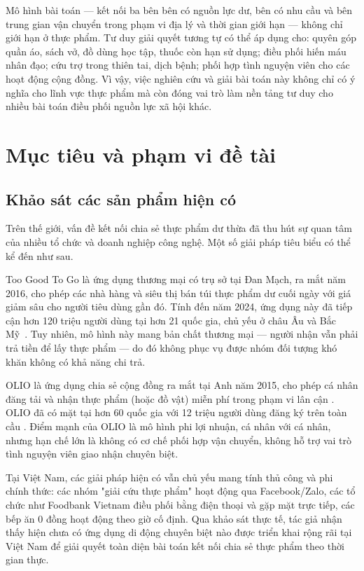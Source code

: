 \documentclass[../main.tex]{subfiles}%
\begin{document}
Mô hình bài toán — kết nối ba bên bên có nguồn lực dư, bên có nhu cầu và bên trung gian vận chuyển trong phạm vi địa lý và thời gian giới hạn — không chỉ giới hạn ở thực phẩm. Tư duy giải quyết tương tự có thể áp dụng cho: quyên góp quần áo, sách vở, đồ dùng học tập, thuốc còn hạn sử dụng; điều phối hiến máu nhân đạo; cứu trợ trong thiên tai, dịch bệnh; phối hợp tình nguyện viên cho các hoạt động cộng đồng. Vì vậy, việc nghiên cứu và giải bài toán này không chỉ có ý nghĩa cho lĩnh vực thực phẩm mà còn đóng vai trò làm nền tảng tư duy cho nhiều bài toán điều phối nguồn lực xã hội khác.

\section{Mục tiêu và phạm vi đề tài}%
\label{section:1.2}

\subsection{Khảo sát các sản phẩm hiện có}
\label{subsection:1.2.1}
Trên thế giới, vấn đề kết nối chia sẻ thực phẩm dư thừa đã thu hút sự quan tâm của nhiều tổ chức và doanh nghiệp công nghệ. Một số giải pháp tiêu biểu có thể kể đến như sau. 

Too Good To Go là ứng dụng thương mại có trụ sở tại Đan Mạch, ra mắt năm 2016, cho phép các nhà hàng và siêu thị bán túi thực phẩm dư cuối ngày với giá giảm sâu cho người tiêu dùng gần đó. Tính đến năm 2024, ứng dụng này đã tiếp cận hơn 120 triệu người dùng tại hơn 21 quốc gia, chủ yếu ở châu Âu và Bắc Mỹ~\cite{TooGoodToGo}. Tuy nhiên, mô hình này mang bản chất thương mại — người nhận vẫn phải trả tiền để lấy thực phẩm — do đó không phục vụ được nhóm đối tượng khó khăn không có khả năng chi trả.

OLIO là ứng dụng chia sẻ cộng đồng ra mắt tại Anh năm 2015, cho phép cá nhân đăng tải và nhận thực phẩm (hoặc đồ vật) miễn phí trong phạm vi lân cận \cite{Olio}. OLIO đã có mặt tại hơn 60 quốc gia với 12 triệu người dùng đăng ký trên toàn cầu \cite{Olio}. Điểm mạnh của OLIO là mô hình phi lợi nhuận, cá nhân với cá nhân, nhưng hạn chế lớn là không có cơ chế phối hợp vận chuyển, không hỗ trợ vai trò tình nguyện viên giao nhận chuyên biệt.

Tại Việt Nam, các giải pháp hiện có vẫn chủ yếu mang tính thủ công và phi chính thức: các nhóm "giải cứu thực phẩm" hoạt động qua Facebook/Zalo, các tổ chức như Foodbank Vietnam điều phối bằng điện thoại và gặp mặt trực tiếp, các bếp ăn 0 đồng hoạt động theo giờ cố định. Qua khảo sát thực tế, tác giả nhận thấy hiện chưa có ứng dụng di động chuyên biệt nào được triển khai rộng rãi tại Việt Nam để giải quyết toàn diện bài toán kết nối chia sẻ thực phẩm theo thời gian thực.
\end{document}
